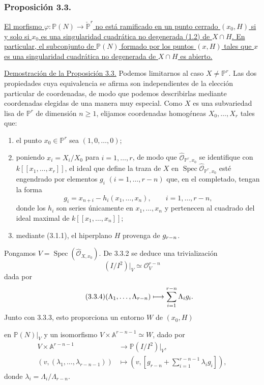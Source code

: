 \subsubsection*{Proposición 3.3.}
\underline{El morfismo
$\varphi:\mathbb P(N)\to\check{\mathbb P}^{r}$ no está ramificado en
un punto cerrado $(x_0,H)$ si y solo si $x_0$ es una singularidad
cuadrática no degenerada (1.2) de $X\cap H$. En particular, el
subconjunto de $\mathbb P(N)$ formado por los puntos $(x,H)$ tales que
$x$ es una singularidad cuadrática no degenerada de $X\cap H$ es
abierto.}

\pageoriginale

\noindent\underline{Demostración de la Proposición 3.3.}
Podemos limitarnos al caso $X\ne\mathbb P^r$. Las dos propiedades cuya
equivalencia se afirma son independientes de la elección particular de
coordenadas, de modo que podemos describirlas mediante coordenadas
elegidas de una manera muy especial. Como $X$ es una subvariedad lisa
de $\mathbb P^r$ de dimensión $n\geq1$, elijamos coordenadas homogéneas
$X_0,\ldots,X_r$ tales que:
\begin{enumerate}
\item[3.3.1.] el punto $x_0\in\mathbb P^r$ sea
$(1,0,\ldots,0)$;
\item[3.3.2.] poniendo $x_i=X_i/X_0$ para $i=1,\ldots,r$, de modo que
$\widehat{\mathcal O}_{\mathbb P^r,x_0}$ se identifique con
$k[[x_1,\ldots,x_r]]$, el ideal que define la traza de $X$ en
$\operatorname{Spec}\widehat{\mathcal O}_{\mathbb P^r,x_0}$ esté
engendrado por elementos $g_i$ $(i=1,\ldots,r-n)$ que, en el
completado, tengan la forma
\[
g_i=x_{n+i}-h_i(x_1,\ldots,x_n),
\qquad i=1,\ldots,r-n,
\]
donde los $h_i$ son series únicamente en $x_1,\ldots,x_n$ y
pertenecen al cuadrado del ideal maximal de
$k[[x_1,\ldots,x_n]]$;
\item[3.3.3.] mediante (3.1.1), el hiperplano $H$ provenga de
$g_{\sisi{n-r}{r-n}}$.
\end{enumerate}

Pongamos $V=\operatorname{Spec}(\widehat{\mathcal O}_{X,x_0})$.
De 3.3.2 se deduce una trivialización
\[
(I/I^2)|_V\simeq\mathcal O_V^{r-n}
\]
dada por
\begin{equation}\tag{3.3.4}
(\Lambda_1,\ldots,\Lambda_{r-n})\longmapsto
\sum_{i=1}^{\sisi{n-r}{r-n}}\Lambda_i g_i.
\end{equation}
Junto con 3.3.3, esto proporciona un entorno $W$ de $(x_0,H)$

\pageoriginale

en $\mathbb P(N)|_V$ y un isomorfismo
$V\times\mathbb A^{r-n-1}\simeq W$, dado por
\begin{equation}\tag{3.3.5}
\begin{aligned}
V\times\mathbb A^{r-n-1}&\longrightarrow\mathbb P(I/I^2)|_V,\\
(v,(\lambda_1,\ldots,\lambda_{r-n-1}))&\longmapsto
\left(v,\left[g_{r-n}+
\sum_{i=1}^{r-n-1}\lambda_i g_i\right]\right),
\end{aligned}
\end{equation}
donde $\lambda_i=\Lambda_i/\Lambda_{r-n}$.

